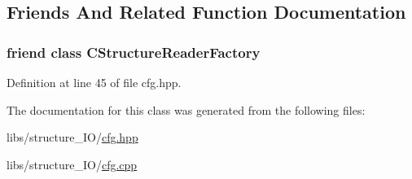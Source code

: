 \subsection{Friends And Related Function Documentation}
\hypertarget{class_q_s_t_e_m_1_1_c_cfg_reader_a3cb3ed52e085d68c53079740b35a543f}{
\subsubsection[{C\-Structure\-Reader\-Factory}]{\setlength{\rightskip}{0pt plus 5cm}friend class {\bf C\-Structure\-Reader\-Factory}\hspace{0.3cm}{\ttfamily [friend]}}}\label{class_q_s_t_e_m_1_1_c_cfg_reader_a3cb3ed52e085d68c53079740b35a543f}


Definition at line 45 of file cfg.\-hpp.



The documentation for this class was generated from the following files\-:\begin{DoxyCompactItemize}
\item 
libs/structure\-\_\-\-I\-O/\hyperlink{cfg_8hpp}{cfg.\-hpp}\item 
libs/structure\-\_\-\-I\-O/\hyperlink{cfg_8cpp}{cfg.\-cpp}\end{DoxyCompactItemize}
